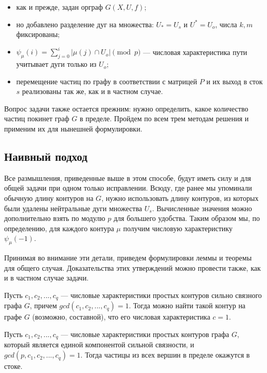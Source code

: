 \begin{itemize}
	\item как и прежде, задан орграф $G(X,U,f)$;
	\item но добавлено разделение дуг на множества: $U_* = U_s$ и $U^* = U_o$, числа $k, m$ фиксированы;
	\item $\psi_\mu(i) = \sum\limits_{j=0}^i | \mu(j) \cap U_o | \pmod p$ --- числовая характеристика пути учитывает дуги только из $U_o$; 
	\item перемещение частиц по графу в соответствии с матрицей $P$ и их выход в сток $s$ реализованы так же, как и в частном случае.
\end{itemize}

Вопрос задачи также остается прежним: нужно определить, какое количество частиц покинет граф $G$ в пределе. Пройдем по всем трем методам решения и применим их для нынешней формулировки. 

\subsection{Наивный подход}

Все размышления, приведенные выше в этом способе, будут иметь силу и для общей задачи при одном только исправлении. Всюду, где ранее мы упоминали обычную длину контуров на $G$, нужно использовать длину контуров, из которых были удалены нейтральные дуги множества $U_s$. Вычисленные значения можно дополнительно взять по модулю $p$ для большего удобства. Таким образом мы, по определению, для каждого контура $\mu$ получим числовую характеристику $\psi_\mu(-1)$. 

Принимая во внимание эти детали, приведем формулировки леммы и теоремы для общего случая. Доказательства этих утверждений можно провести также, как и в частном случае задачи. 

\begin{lemma}
	Пусть $c_1, c_2, ... , c_q$ --- числовые характеристики простых контуров сильно связного графа $G$, причем $gcd(c_1, c_2, ... , c_q) = 1$. Тогда можно найти такой контур на графе $G$ (возможно, составной), что его числовая характеристика $c = 1$.
\end{lemma}

\begin{theorem}
	Пусть $c_1, c_2, ... , c_q $ --- числовые характеристики простых контуров графа $G$, который является единой компонентой сильной связности, и $gcd(p, c_1, c_2, ... , c_q) = 1$. Тогда частицы из всех вершин в пределе окажутся в стоке.
\end{theorem}


